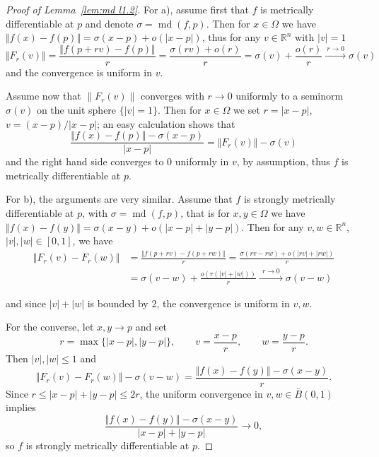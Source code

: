 \documentclass[12pt,leqno]{amsart}
\theoremstyle{definition}
\newcommand{\bbbr}{\mathbb R}
\def\md{\operatorname{md}}
\numberwithin{theorem}{section} \numberwithin{equation}{section}
\begin{document}
\begin{proof}[Proof of Lemma~\ref{lem:md l1.2}]
For a), assume first that $f$ is metrically differentiable at $p$ and denote $\sigma=\md(f,p)$. Then for $x\in\Omega$ we have $\Vert f(x)-f(p)\Vert=\sigma(x-p)+o(|x-p|)$, thus for any $v\in\bbbr^n$ with $|v|=1$
\begin{equation*}
\Vert F_r(v)\Vert=\frac{\Vert f(p+rv)-f(p)\Vert}{r}=\frac{\sigma(rv)+o(r)}{r}=\sigma(v)+\frac{o(r)}{r}\xrightarrow{~r\to 0~}\sigma(v)
%
\end{equation*}
and the convergence is uniform in $v$.

Assume now that $\|F_r(v)\|$ converges with $r\to 0$ uniformly to a seminorm $\sigma(v)$ on the unit sphere $\{|v|=1\}$. Then for $x\in\Omega$ we set $r=|x-p|$, $v=(x-p)/|x-p|$; an easy calculation shows that
$$
\frac{\Vert f(x)-f(p)\Vert-\sigma(x-p)}{|x-p|}=\Vert F_r(v)\Vert-\sigma(v)
$$
and the right hand side converges to 0 uniformly in $v$, by assumption, thus $f$ is metrically differentiable at $p$.

For b), the arguments are very similar. Assume that $f$ is strongly metrically differentiable at $p$, with $\sigma=\md(f,p)$, that is for $x,y\in\Omega$ we have $\Vert f(x)-f(y)\Vert =\sigma(x-y)+o(|x-p|+|y-p|)$.
Then for any $v,w\in \bbbr^n$, $|v|, |w|\in [0,1]$, we have
\begin{equation*}
    \begin{split}
\Vert F_r(v)-F_r(w)\Vert &=\frac{\Vert f(p+rv)-f(p+rw)\Vert}{r}=\frac{\sigma(rv-rw)+o(|rv|+|rw|)}{r}\\
&=\sigma(v-w)+\frac{o(r(|v|+|w|))}{r}\xrightarrow{~~r\to 0~~}    \sigma(v-w)
    \end{split}
\end{equation*}

and since $|v|+|w|$ is bounded by 2, the convergence is uniform in $v,w$.

For the converse, let $x,y\to p$ and set
$$
    r=\max\{|x-p|,|y-p|\},\qquad v=\frac{x-p}{r},\qquad w=\frac{y-p}{r}.
$$
Then $|v|,|w|\leq 1$ and
$$
\Vert F_r(v)-F_r(w)\Vert-\sigma(v-w)=\frac{\Vert f(x)-f(y)\Vert-\sigma(x-y)}{r}.
$$
Since $r\le |x-p|+|y-p|\leq 2r$,
the uniform convergence in $v,w\in \bar{B}(0,1)$ implies
$$
\frac{\Vert f(x)-f(y)\Vert-\sigma(x-y)}{|x-p|+|y-p|} \to 0,
$$
so $f$ is strongly metrically differentiable at $p$.
\end{proof}
\end{document}
